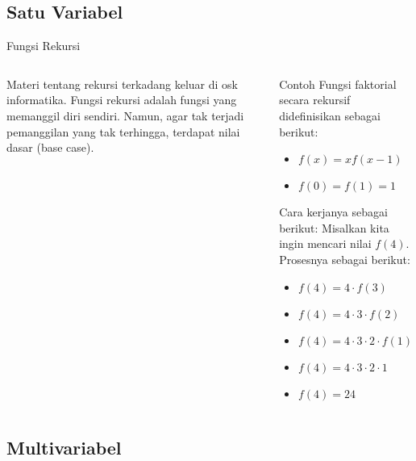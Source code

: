 \documentclass[10pt,aspectratio=54, handout]{beamer}
\begin{document}
  \subsection{Satu Variabel}
  \label{sub:Satu Variabel}
  
  \begin{frame}{Fungsi Rekursi}
  \begin{columns}[c]
  Materi tentang rekursi terkadang keluar di osk informatika. Fungsi rekursi adalah fungsi yang memanggil diri sendiri. Namun, agar tak terjadi pemanggilan yang tak terhingga, terdapat nilai dasar (base case).
    
    
    \begin{exampleblock}{Contoh}
      Fungsi faktorial secara rekursif didefinisikan sebagai berikut:
      \begin{itemize}
        \item $f(x) = xf(x-1)$
        \item $f(0) = f(1) = 1$
      \end{itemize}
      Cara kerjanya sebagai berikut: Misalkan kita ingin mencari nilai $f(4)$. Prosesnya sebagai berikut:
      \begin{itemize}
        \item $f(4) = 4\cdot f(3)$
        \item $f(4) = 4\cdot 3\cdot f(2)$
        \item $f(4) = 4\cdot 3\cdot 2\cdot f(1)$
        \item $f(4) = 4\cdot 3\cdot 2\cdot 1$
        \item $\boxed{f(4) = 24}$
      \end{itemize}
      
    \end{exampleblock}
  
  \end{columns}
  
  \end{frame}
  
  \subsection{Multivariabel}
  \label{sub:Multivariabel}
  
\end{document}

